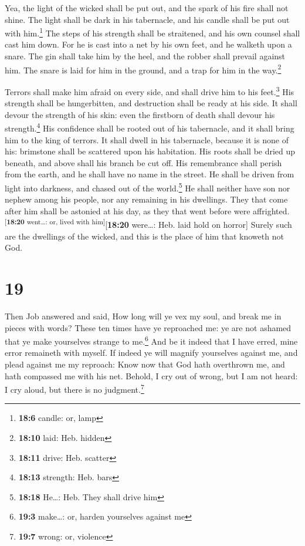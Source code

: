  Yea, the light of the wicked shall be put out, and the
spark of his fire shall not shine.  The light shall be
dark in his tabernacle, and his candle shall be put out with
him.\footnote{\textbf{18:6} candle: or, lamp}  The steps
of his strength shall be straitened, and his own counsel shall cast him
down.  For he is cast into a net by his own feet, and he
walketh upon a snare.  The gin shall take him by the heel,
and the robber shall prevail against him.  The snare is
laid for him in the ground, and a trap for him in the way.\footnote{\textbf{18:10}
  laid: Heb. hidden}

 Terrors shall make him afraid on every side, and shall
drive him to his feet.\footnote{\textbf{18:11} drive: Heb. scatter}
 His strength shall be hungerbitten, and destruction
shall be ready at his side.  It shall devour the strength
of his skin: even the firstborn of death shall devour his
strength.\footnote{\textbf{18:13} strength: Heb. bars} 
His confidence shall be rooted out of his tabernacle, and it shall bring
him to the king of terrors.  It shall dwell in his
tabernacle, because it is none of his: brimstone shall be scattered upon
his habitation.  His roots shall be dried up beneath, and
above shall his branch be cut off.  His remembrance shall
perish from the earth, and he shall have no name in the street.
 He shall be driven from light into darkness, and chased
out of the world.\footnote{\textbf{18:18} He\ldots: Heb. They shall
  drive him}  He shall neither have son nor nephew among
his people, nor any remaining in his dwellings.  They
that come after him shall be astonied at his day, as they that went
before were affrighted.\textsuperscript{{[}\textbf{18:20} went\ldots:
or, lived with him{]}}{[}\textbf{18:20} were\ldots: Heb. laid hold on
horror{]}  Surely such are the dwellings of the wicked,
and this is the place of him that knoweth not God.

\hypertarget{section-18}{%
\section{19}\label{section-18}}

 Then Job answered and said,  How long will
ye vex my soul, and break me in pieces with words?  These
ten times have ye reproached me: ye are not ashamed that ye make
yourselves strange to me.\footnote{\textbf{19:3} make\ldots: or, harden
  yourselves against me}  And be it indeed that I have
erred, mine error remaineth with myself.  If indeed ye
will magnify yourselves against me, and plead against me my reproach:
 Know now that God hath overthrown me, and hath compassed
me with his net.  Behold, I cry out of wrong, but I am not
heard: I cry aloud, but there is no judgment.\footnote{\textbf{19:7}
  wrong: or, violence}

